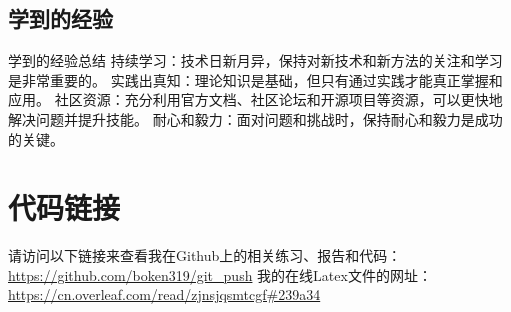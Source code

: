\documentclass[a4paper, 12pt]{article}
\begin{document}
\subsection{学到的经验}
学到的经验总结
持续学习：技术日新月异，保持对新技术和新方法的关注和学习是非常重要的。
实践出真知：理论知识是基础，但只有通过实践才能真正掌握和应用。
社区资源：充分利用官方文档、社区论坛和开源项目等资源，可以更快地解决问题并提升技能。
耐心和毅力：面对问题和挑战时，保持耐心和毅力是成功的关键。

 \section{代码链接}
      请访问以下链接来查看我在Github上的相关练习、报告和代码：
\url{https://github.com/boken319/git_push}
我的在线Latex文件的网址：
\url{https://cn.overleaf.com/read/zjnsjqsmtcgf#239a34}
\end{document}
